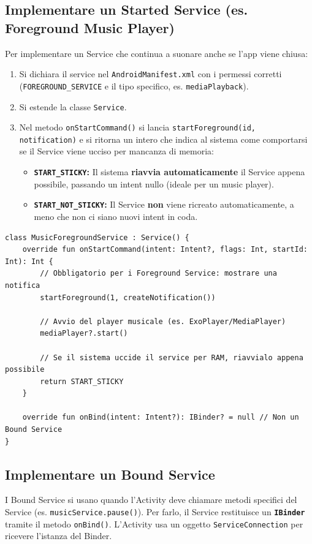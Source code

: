 \subsection{Implementare un Started Service (es. Foreground Music Player)}
Per implementare un Service che continua a suonare anche se l'app viene chiusa:
\begin{enumerate}
    \item Si dichiara il service nel \texttt{AndroidManifest.xml} con i permessi corretti (\texttt{FOREGROUND\_SERVICE} e il
    tipo specifico, es. \texttt{mediaPlayback}).
    \item Si estende la classe \texttt{Service}.
    \item Nel metodo \texttt{onStartCommand()} si lancia \texttt{startForeground(id, notification)} e si ritorna un intero
    che indica al sistema come comportarsi se il Service viene ucciso per mancanza di memoria:
    \begin{itemize}
        \item \textbf{\texttt{START\_STICKY}:} Il sistema \textbf{riavvia automaticamente} il Service appena possibile,
        passando un intent nullo (ideale per un music player).
        \item \textbf{\texttt{START\_NOT\_STICKY}:} Il Service \textbf{non} viene ricreato automaticamente, a meno che
        non ci siano nuovi intent in coda.
    \end{itemize}
\end{enumerate}

\begin{lstlisting}[caption={Creazione di un Foreground Service}]
class MusicForegroundService : Service() {
    override fun onStartCommand(intent: Intent?, flags: Int, startId: Int): Int {
        // Obbligatorio per i Foreground Service: mostrare una notifica
        startForeground(1, createNotification())

        // Avvio del player musicale (es. ExoPlayer/MediaPlayer)
        mediaPlayer?.start()

        // Se il sistema uccide il service per RAM, riavvialo appena possibile
        return START_STICKY
    }

    override fun onBind(intent: Intent?): IBinder? = null // Non un Bound Service
}
\end{lstlisting}

\subsection{Implementare un Bound Service}
I Bound Service si usano quando l'Activity deve chiamare metodi specifici del Service (es. \texttt{musicService.pause()}).
Per farlo, il Service restituisce un \textbf{\texttt{IBinder}} tramite il metodo \texttt{onBind()}.
L'Activity usa un oggetto \texttt{ServiceConnection} per ricevere l'istanza del Binder.

